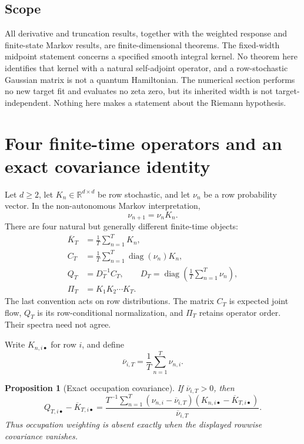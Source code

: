 \documentclass[11pt]{article}
\newtheorem{proposition}[theorem]{Proposition}
\theoremstyle{definition}
\theoremstyle{remark}
\newcommand{\R}{\mathbb R}
\newcommand{\diag}{\operatorname{diag}}
\begin{document}
\subsection*{Scope}

All derivative and truncation results, together with the weighted response and
finite-state Markov results, are finite-dimensional theorems.  The fixed-width
midpoint statement concerns
a specified smooth integral kernel.  No theorem here identifies that kernel
with a natural self-adjoint operator, and a row-stochastic Gaussian matrix is
not a quantum Hamiltonian.  The numerical section performs no new target fit
and evaluates no zeta zero, but its inherited width is not target-independent.
Nothing here makes a statement about the Riemann hypothesis.

\section{Four finite-time operators and an exact covariance identity}
\label{sec:four}

Let $d\ge2$, let $K_n\in\R^{d\times d}$ be row stochastic, and let
$\nu_n$ be a row probability vector.  In the non-autonomous Markov
interpretation,
\[
  \nu_{n+1}=\nu_n K_n.
\]
There are four natural but generally different finite-time objects:
\begin{align}
  \overline K_T&=\frac1T\sum_{n=1}^T K_n,
  \label{eq:unweighted-average}\\
  C_T&=\frac1T\sum_{n=1}^T\diag(\nu_n)K_n,
  \label{eq:flow-matrix}\\
  Q_T&=D_T^{-1}C_T,\qquad
  D_T=\diag\left(\frac1T\sum_{n=1}^T\nu_n\right),
  \label{eq:weighted-kernel}\\
  \Pi_T&=K_1K_2\cdots K_T.
  \label{eq:product}
\end{align}
The last convention acts on row distributions.  The matrix $C_T$ is expected
joint flow, $Q_T$ is its row-conditional normalization, and $\Pi_T$ retains
operator order.  Their spectra need not agree.

Write $K_{n,i\bullet}$ for row $i$, and define
\[
  \overline\nu_{i,T}=\frac1T\sum_{n=1}^T\nu_{n,i}.
\]

\begin{proposition}[Exact occupation covariance]\label{prop:covariance}
If $\overline\nu_{i,T}>0$, then
\begin{equation}\label{eq:covariance}
  Q_{T,i\bullet}-\overline K_{T,i\bullet}
  =
  \frac{
    T^{-1}\sum_{n=1}^T
    (\nu_{n,i}-\overline\nu_{i,T})
    (K_{n,i\bullet}-\overline K_{T,i\bullet})
  }{\overline\nu_{i,T}}.
\end{equation}
Thus occupation weighting is absent exactly when the displayed rowwise
covariance vanishes.
\end{proposition}
\end{document}

